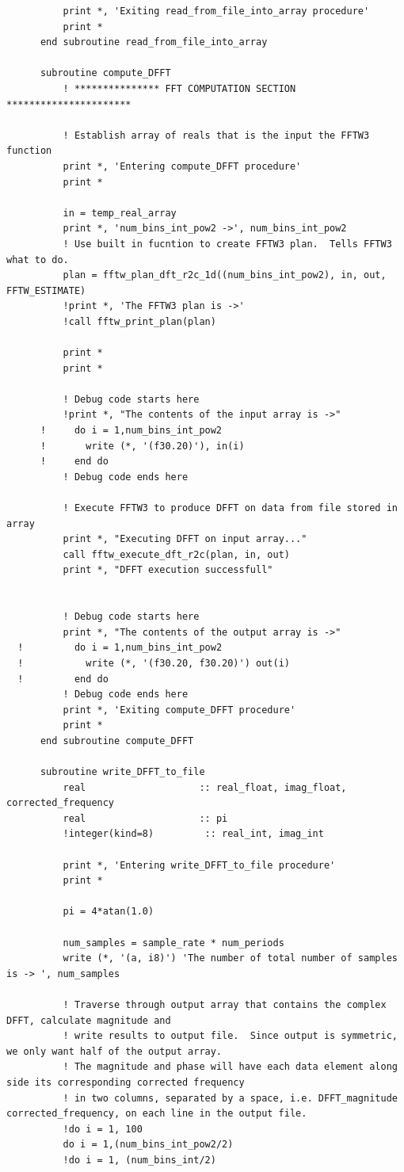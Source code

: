 \begin{verbatim}
          print *, 'Exiting read_from_file_into_array procedure'
          print *
      end subroutine read_from_file_into_array
        
      subroutine compute_DFFT
          ! *************** FFT COMPUTATION SECTION **********************
          
          ! Establish array of reals that is the input the FFTW3 function
          print *, 'Entering compute_DFFT procedure'
          print *
          
          in = temp_real_array
          print *, 'num_bins_int_pow2 ->', num_bins_int_pow2
          ! Use built in fucntion to create FFTW3 plan.  Tells FFTW3 what to do.
          plan = fftw_plan_dft_r2c_1d((num_bins_int_pow2), in, out, FFTW_ESTIMATE)
          !print *, 'The FFTW3 plan is ->'
          !call fftw_print_plan(plan)
          
          print *
          print *
              
          ! Debug code starts here
          !print *, "The contents of the input array is ->"
      ! 	do i = 1,num_bins_int_pow2			 
      ! 	  write (*, '(f30.20)'), in(i)
      ! 	end do
          ! Debug code ends here
          
          ! Execute FFTW3 to produce DFFT on data from file stored in array
          print *, "Executing DFFT on input array..."
          call fftw_execute_dft_r2c(plan, in, out)
          print *, "DFFT execution successfull"
          
  
          ! Debug code starts here
          print *, "The contents of the output array is ->"
  !     	do i = 1,num_bins_int_pow2			 
  !     	  write (*, '(f30.20, f30.20)') out(i)
  !     	end do
          ! Debug code ends here
          print *, 'Exiting compute_DFFT procedure'
          print *
      end subroutine compute_DFFT
        
      subroutine write_DFFT_to_file
          real                    :: real_float, imag_float, corrected_frequency
          real                    :: pi
          !integer(kind=8)         :: real_int, imag_int
  
          print *, 'Entering write_DFFT_to_file procedure'
          print *
      
          pi = 4*atan(1.0)
  
          num_samples = sample_rate * num_periods
          write (*, '(a, i8)') 'The number of total number of samples is -> ', num_samples
      
          ! Traverse through output array that contains the complex DFFT, calculate magnitude and
          ! write results to output file.  Since output is symmetric, we only want half of the output array.
          ! The magnitude and phase will have each data element along side its corresponding corrected frequency
          ! in two columns, separated by a space, i.e. DFFT_magnitude corrected_frequency, on each line in the output file.
          !do i = 1, 100
          do i = 1,(num_bins_int_pow2/2)
          !do i = 1, (num_bins_int/2)
  

\end{verbatim}
